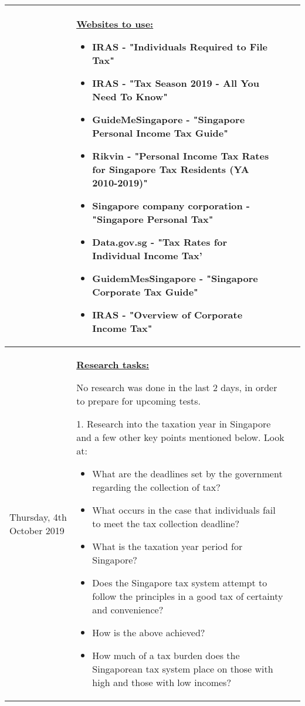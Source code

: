 \documentclass[12pt, a4paper]{article}
\newlength\combinedlength
\begin{document}
\begin{landscape}
\begin{longtable}{|m{5cm}|m{5cm}|m{5cm}|m{10.31cm}|}
{		}&
	
					 	\textbf{\underline{Websites to use:}}
		\newline
		
		\begin{itemize}
			\item IRAS - "Individuals Required to File Tax"
			\item IRAS - "Tax Season 2019 - All You Need To Know"
			\item GuideMeSingapore - "Singapore Personal Income Tax Guide"
			\item Rikvin - "Personal Income Tax Rates for Singapore Tax Residents (YA 2010-2019)"
			\item Singapore company corporation - "Singapore Personal Tax"
			\item Data.gov.sg - "Tax Rates for Individual Income Tax'
			\item GuidemMesSingapore - "Singapore Corporate Tax Guide"
			\item IRAS - "Overview of Corporate Income Tax"
			\end{itemize}
		
		\\
		\hline
		
			Thursday, 4th October 2019 & \multicolumn{2}{|m{\combinedlength}|}{	
			
			\textbf{\underline{Research tasks:}}
			\newline
			
			No research was done in the last 2 days, in order to prepare for upcoming tests.
			\newline
			
			1. Research into the taxation year in Singapore and a few other key points mentioned below. Look at:
			
			\begin{itemize}
				\item What are the deadlines set by the government regarding the collection of tax?
				\item What occurs in the case that individuals fail to meet the tax collection deadline?
				\item What is the taxation year period for Singapore?
				\item Does the Singapore tax system attempt to follow the principles in a good tax of certainty and convenience?
				\item How is the above achieved?
				\item How much of a tax burden does the Singaporean tax system place on those with high and those with low incomes?
			\end{itemize}
			
}
\end{longtable}
\end{landscape}
\end{document}
